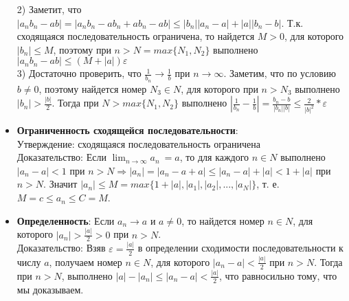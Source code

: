 \documentclass[12pt,a4paper]{article}
\begin{document}
\begin{itemize}
    2) Заметит, что $|a_n b_n - a b| = |a_n b_n - a b_n + a b_n - a b| \leq |b_n| |a_n - a| + |a| |b_n - b|$. Т.к. сходящаяся последовательность ограничена, то найдется $M > 0$, для которого $|b_n| \leq M$, поэтому при  $n > N = max\{ N_1, N_2\}$ выполнено $|a_n b_n - a b| \leq (M + |a|)\varepsilon$\\
    3) Достаточно проверить, что $\frac{1}{b_n} \to \frac{1}{b}$ при $n \to \infty$. Заметим, что по условию $b \neq 0$, поэтому найдется номер $N_3 \in N$, для которого при $n > N_3$ выполнено $|b_n| > \frac{|b|}{2}$. Тогда при $N > max \{N_1, N_2\}$ выполнено $|\frac{1}{b_n} - \frac{1}{b}| = \frac{b_n - b}{|b_n| |b|} \leq \frac{2}{|b|^2} * \varepsilon$\\
    \item \textbf{Ограниченность сходящейся последовательности}:\\
    Утверждение: сходящаяся последовательность ограничена\\
    Доказательство: Если $\lim_{n \to \infty} a_n\ = a$, то для каждого $n \in N$ выполнено  
    $|a_n - a| < 1$ при $n > N  \Rightarrow |a_n| = |a_n - a + a| \leq |a_n - a| + |a| < 1 + |a|$ при $n > N$.
    Значит $|a_n| \leq M = max\{1 + |a|, |a_1|, |a_2|, ..., |a_N|\}$, т. е. $M = c \leq a_n \leq C = M$.\\
    \item \textbf{Определенность}:
    Если $a_n \to a$ и $a \neq 0$, то найдется номер $n \in N$, для которого $|a_n| > \frac{|a|}{2} > 0$ при $n > N$.\\
    Доказательство: Взяв $\varepsilon = \frac{|a|}{2}$ в определении сходимости последовательности к числу $a$, получаем номер $n \in N$, для которого $|a_n - a| < \frac{|a|}{2}$ при $n > N$. Тогда при $n > N$, выполнено $|a| - |a_n| \leq |a_n - a| < \frac{|a|}{2}$, что равносильно тому, что мы доказываем.
  
\end{itemize}
\end{document}
